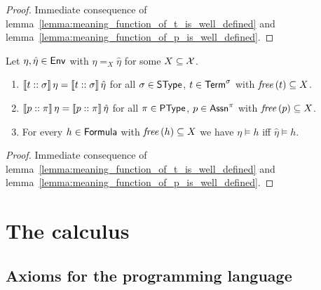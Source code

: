 \documentclass[12pt,a4paper]{report}
\begin{document}
\begin{proof}
  Immediate consequence of lemma~\ref{lemma:meaning_function_of_t_is_well_defined}
  and lemma~\ref{lemma:meaning_function_of_p_is_well_defined}.
\end{proof}

\begin{theorem}[Coincidence] \label{theorem:coincidence}
  Let $\eta,\hat{\eta}\in\mathsf{Env}$ with $\eta =_X \hat{\eta}$ for some $X \subseteq \mathcal{X}$.
  \begin{enumerate}
    \item $\llbracket{t}\mathrel{::}{\sigma}\rrbracket\,\eta = \llbracket{t}\mathrel{::}{\sigma}\rrbracket\,\hat{\eta}$
          for all $\sigma\in\mathsf{SType}$, $t \in\mathsf{Term}^\sigma$ with $\mathit{free}\,(t) \subseteq X$.
    \item $\llbracket{p}\mathrel{::}{\pi}\rrbracket\,\eta = \llbracket{p}\mathrel{::}{\pi}\rrbracket\,\hat{\eta}$
          for all $\pi\in\mathsf{PType}$, $p \in \mathsf{Assn}^\pi$ with $\mathit{free}\,(p) \subseteq X$.
    \item For every $h \in \mathsf{Formula}$
          with $\mathit{free}\,(h) \subseteq X$ we have $\eta \models h$ iff $\hat{\eta} \models h$.
  \end{enumerate}
\end{theorem}

\begin{proof}
  Immediate consequence of lemma~\ref{lemma:meaning_function_of_t_is_well_defined}
  and lemma~\ref{lemma:meaning_function_of_p_is_well_defined}.
\end{proof}



\chapter{The calculus}



\section{Axioms for the programming language}
\end{document}
